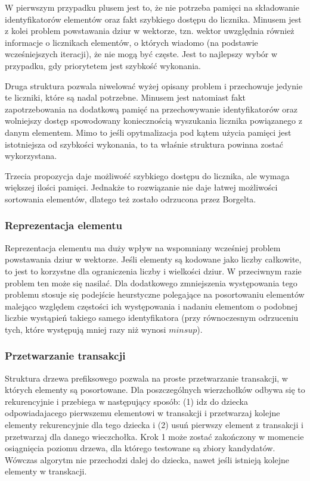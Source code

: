 W pierwszym przypadku plusem jest to, że nie potrzeba pamięci na składowanie identyfikatorów elementów oraz fakt szybkiego dostępu do licznika. Minusem jest z kolei problem powstawania dziur w wektorze, tzn. wektor uwzględnia również informacje o licznikach elementów, o których wiadomo (na podstawie wcześniejszych iteracji), że nie mogą być częste. Jest to najlepszy wybór w przypadku, gdy priorytetem jest szybkość wykonania.

Druga struktura pozwala niwelować wyżej opisany problem i przechowuje jedynie te liczniki, które są nadal potrzebne. Minusem jest natomiast fakt zapotrzebowania na dodatkową pamięć na przechowywanie identyfikatorów oraz wolniejszy dostęp spowodowany koniecznością wyszukania licznika powiązanego z danym elementem. Mimo to jeśli opytmalizacja pod kątem użycia pamięci jest istotniejsza od szybkości wykonania, to ta właśnie struktura powinna zostać wykorzystana.

Trzecia propozycja daje możliwość szybkiego dostępu do licznika, ale wymaga większej ilości pamięci. Jednakże to rozwiązanie nie daje łatwej możliwości sortowania elementów, dlatego też zostało odrzucona przez Borgelta.

\subsubsection*{Reprezentacja elementu}
Reprezentacja elementu ma duży wpływ na wspomniany wcześniej problem powstawania dziur w wektorze. Jeśli elementy są kodowane jako liczby całkowite, to jest to korzystne dla ograniczenia liczby i wielkości dziur. W przeciwnym razie problem ten może się nasilać. Dla dodatkowego zmniejszenia występowania tego problemu stosuje się podejście heurstyczne polegające na posortowaniu elementów malejąco względem częstości ich występowania i nadaniu elementom o podobnej liczbie wystąpień takiego samego identyfikatora (przy równoczesnym odrzuceniu tych, które występują mniej razy niż wynosi \(minsup\)). 

\subsubsection*{Przetwarzanie transakcji}
Struktura drzewa prefiksowego pozwala na proste przetwarzanie transakcji, w których elementy są posortowane. Dla poszczególnych wierzchołków odbywa się to rekurencyjnie i przebiega w następujący sposób: (1) idz do dziecka odpowiadajacego pierwszemu elementowi w transakcji i przetwarzaj kolejne elementy rekurencyjnie dla tego dziecka i (2) usuń pierwszy element z transakcji i przetwarzaj dla danego wieczchołka. Krok 1 może zostać zakończony w momencie osiągnięcia poziomu drzewa, dla którego testowane są zbiory kandydatów. Wówczas algorytm nie przechodzi dalej do dziecka, nawet jeśli istnieją kolejne elementy w transkacji. 

